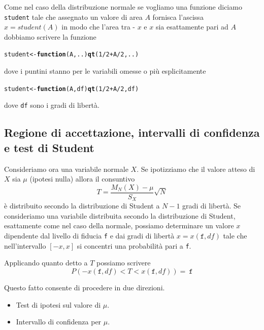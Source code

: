 \documentclass[onecolumn,12pt]{book}\usepackage[]{graphicx}\usepackage[]{color}
\makeatletter
\newcommand{\hlnum}[1]{\textcolor[rgb]{0.686,0.059,0.569}{#1}}%
\newcommand{\hlopt}[1]{\textcolor[rgb]{0,0,0}{#1}}%
\newcommand{\hlstd}[1]{\textcolor[rgb]{0.345,0.345,0.345}{#1}}%
\newcommand{\hlkwa}[1]{\textcolor[rgb]{0.161,0.373,0.58}{\textbf{#1}}}%
\newcommand{\hlkwb}[1]{\textcolor[rgb]{0.69,0.353,0.396}{#1}}%
\newcommand{\hlkwc}[1]{\textcolor[rgb]{0.333,0.667,0.333}{#1}}%
\newcommand{\hlkwd}[1]{\textcolor[rgb]{0.737,0.353,0.396}{\textbf{#1}}}%
\newenvironment{kframe}{%
 \def\at@end@of@kframe{}%
 \ifinner\ifhmode%
  \def\at@end@of@kframe{\end{minipage}}%
  \begin{minipage}{\columnwidth}%
 \fi\fi%
 \def\FrameCommand##1{\hskip\@totalleftmargin \hskip-\fboxsep
 \colorbox{shadecolor}{##1}\hskip-\fboxsep
     \hskip-\linewidth \hskip-\@totalleftmargin \hskip\columnwidth}%
 \MakeFramed {\advance\hsize-\width
   \@totalleftmargin\z@ \linewidth\hsize
   \@setminipage}}%
 {\par\unskip\endMakeFramed%
 \at@end@of@kframe}
\newenvironment{knitrout}{}{} %
\makeatother
\begin{document}
Come nel caso della distribuzione normale se vogliamo una funzione diciamo \texttt{student}  tale che assegnato un valore di area $A$   fornisca l'ascissa $x=student(A)$  in modo che l'area tra - $x$ e $x$ sia esattamente pari ad $A$ dobbiamo scrivere la funzione
\begin{knitrout}
\color{fgcolor}\begin{kframe}
\begin{alltt}
\hlstd{student}\hlkwb{<-}\hlkwa{function} \hlstd{(}\hlkwc{A}\hlstd{,}\hlkwc{..}\hlstd{)} \hlkwd{qt} \hlstd{(}\hlnum{1}\hlopt{/}\hlnum{2} \hlopt{+} \hlstd{A}\hlopt{/}\hlnum{2}\hlstd{,..)}
\end{alltt}
\end{kframe}
\end{knitrout}
dove i puntini stanno per le variabili omesse o pi\`u esplicitamente
\begin{knitrout}
\color{fgcolor}\begin{kframe}
\begin{alltt}
\hlstd{student}\hlkwb{<-}\hlkwa{function} \hlstd{(}\hlkwc{A}\hlstd{,}\hlkwc{df}\hlstd{)} \hlkwd{qt} \hlstd{(}\hlnum{1}\hlopt{/}\hlnum{2} \hlopt{+} \hlstd{A}\hlopt{/}\hlnum{2}\hlstd{,df)}
\end{alltt}
\end{kframe}
\end{knitrout}
dove \texttt{df} sono i gradi di libert\`a. 
\subsection
{Regione di accettazione, intervalli di confidenza e test di Student}

Consideriamo ora una variabile normale $X$. Se ipotizziamo che il valore atteso di $X$ sia   $\mu$ (ipotesi nulla) allora il consuntivo 
\[T=\dfrac{M_N(X)-\mu}{S_X}\sqrt {N}\]
\`e distribuito secondo la distribuzione di Student a $N-1$ gradi di libert\`a. 
Se consideriamo una variabile distribuita secondo la distribuzione di Student, esattamente come nel caso della normale, possiamo determinare un valore $x$ dipendente dal livello di fiducia \texttt{f} e dai gradi di libert\`a 
$x=x(\texttt {f},df)$ tale che nell'intervallo $[-x,x]$ si concentri una probabilit\`a pari a \texttt{f}.

Applicando quanto detto a $T$ possiamo scrivere
\[ P(-x(\texttt {f},df)<T<x(\texttt {f},df))=\ \texttt {f}\]

Questo fatto consente di procedere in due direzioni.
\begin{itemize}
\item Test di ipotesi sul valore di $\mu$.
\item Intervallo di confidenza per $\mu$. 
\end{itemize}
 
\end{document}
